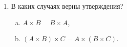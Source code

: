 \begin{enumerate}%
  \item В каких случаях верны утверждения?
    \begin{enumerate}[a)]%
      \item $ A \times B = B \times A $,
      \item $ (A \times B) \times C = A \times (B \times C) $.
    \end{enumerate}
\end{enumerate}